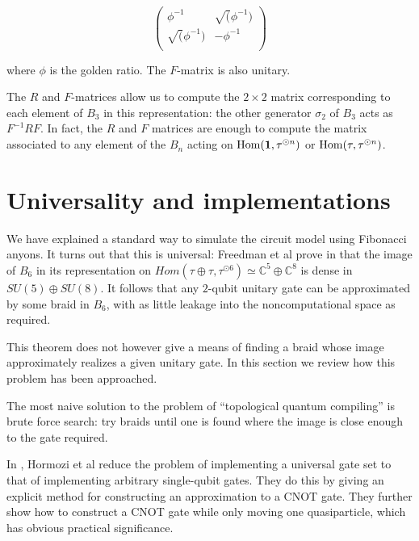 \begin{equation}
\begin{pmatrix}
\phi^{-1} & \sqrt(\phi^{-1}) \\
\sqrt(\phi^{-1}) & -\phi^{-1} \\
\end{pmatrix}
\end{equation}

where $\phi$ is the golden ratio. The $F$-matrix is also unitary.

The $R$ and $F$-matrices allow us to compute the $2 \times 2$ matrix
corresponding to each element of $B_3$ in this representation: the other
generator $\sigma_2$ of $B_3$ acts as $F^{-1}RF$. In fact, the $R$ and $F$
matrices are enough to compute the matrix associated to any element of the
$B_n$ acting on $\operatorname{Hom}(\mathbf{1}, \tau^{\odot n})$ or $\operatorname{Hom}(\tau, \tau^{\odot n})$.


\section{Universality and implementations}

We have explained a standard way to simulate the circuit model using
Fibonacci anyons. It turns out that this is universal:
Freedman et al prove in \cite{Freedman2000} that the image of
$B_6$ in its representation on $Hom(\tau \oplus \tau, \tau^{\odot 6}) \simeq
\mathbb{C}^5 \oplus \mathbb{C}^8$ is dense in $SU(5) \oplus SU(8)$. It follows
that any $2$-qubit unitary gate can be approximated by some braid in $B_6$,
with as little leakage into the noncomputational space as required. 


This theorem does not however give a means of finding a braid whose image
approximately realizes a given unitary gate. In this section we review how this
problem has been approached.

The most naive solution to the problem of ``topological quantum
compiling'' is brute force search: try braids until one is found where the
image is close enough to the gate required.

In \cite{Hormozi2007}, Hormozi et al reduce the problem of implementing a
universal gate set to that of implementing arbitrary single-qubit gates.
They do this by giving an explicit method for constructing an approximation to
a CNOT gate. They further show how to construct a CNOT gate while only moving
one quasiparticle, which has obvious practical significance.


